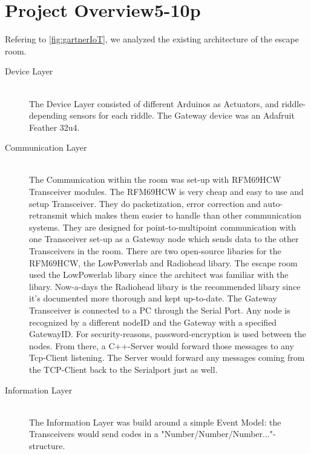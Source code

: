 \chapter{Project Overview5-10p} %

\label{Chapter2} %

Refering to \ref{fig:gartnerIoT}, we analyzed the existing architecture of the escape room.
\begin{description}
	\item[Device Layer]\hfill \\
	      The Device Layer consisted of different Arduinos as Actuators, and riddle-depending sensors for each riddle.
	      The Gateway device was an Adafruit Feather 32u4.
	\item[Communication Layer]\hfill \\
	      The Communication within the room was set-up with RFM69HCW Transceiver modules.\parencite{radiorange}
	      The RFM69HCW is very cheap and easy to use and setup Transceiver. They do packetization, error correction and auto-retransmit which makes them easier to handle than other communication systems.
	      They are designed for point-to-multipoint communication with one Transceiver set-up as a Gateway node which sends data to the other Transceivers in the room.
	      There are two open-source libaries for the RFM69HCW, the LowPowerlab \parencite{LowPowerlab} and Radiohead \parencite{Radiohead} libary.
	      The escape room used the LowPowerlab libary since the architect was familiar with the libary.
          Now-a-days the Radiohead libary is the recommended libary since it's documented more thorough and kept up-to-date.
          The Gateway Transceiver is connected to a PC through the Serial Port. Any node is recognized by a different nodeID and the Gateway with a specified GatewayID. For security-reasons, password-encryption is used between the nodes. 
          From there, a C++-Server would forward those messages to any Tcp-Client listening.    
          The Server would forward any messages coming from the TCP-Client back to the Serialport just as well.
	\item[Information Layer]\hfill \\
        The Information Layer was build around a simple Event Model: the Transceivers would send codes in a "Number/Number/Number..."-structure. 

\end{description}
